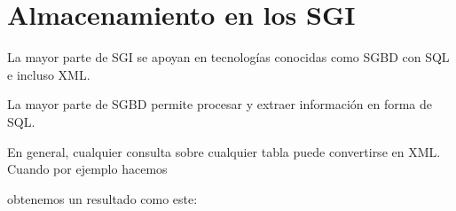\documentclass[letterpaper,10pt,spanish]{sphinxmanual}
\begin{document}
\section{Almacenamiento en los SGI}
\label{\detokenize{tema8:almacenamiento-en-los-sgi}}
La mayor parte de SGI se apoyan en tecnologías conocidas como SGBD con SQL e incluso XML.

La mayor parte de SGBD permite procesar y extraer información en forma de SQL.

En general, cualquier consulta sobre cualquier tabla puede convertirse en XML. Cuando por ejemplo hacemos

\begin{sphinxVerbatim}[commandchars=\\\{\}]
   
\end{sphinxVerbatim}

obtenemos un resultado como este:
\end{document}
